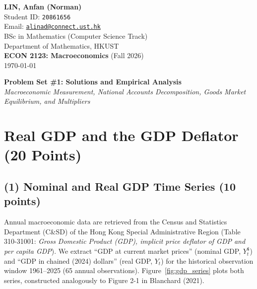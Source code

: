 \documentclass[11pt,a4paper]{article}
\begin{document}
\thispagestyle{plain}

\begin{flushright}
    \textbf{\large LIN, Anfan (Norman)} \\
    Student ID: \texttt{20861656} \\
    Email: \href{mailto:alinad@connect.ust.hk}{\texttt{alinad@connect.ust.hk}} \\
    BSc in Mathematics (Computer Science Track) \\
    Department of Mathematics, HKUST \\
    \textbf{ECON 2123: Macroeconomics} (Fall 2026) \\
    \today
\end{flushright}

\vspace{-0.6em}
\begin{center}
    {\Large \textbf{\color{hkustnavy}Problem Set \#1: Solutions and Empirical Analysis}} \\
    \vspace{0.25em}
    {\footnotesize \textit{Macroeconomic Measurement, National Accounts Decomposition, Goods Market Equilibrium, and Multipliers}}
\end{center}
\vspace{0.3em}

\section{Real GDP and the GDP Deflator (20 Points)}

\subsection*{(1) Nominal and Real GDP Time Series (10 points)}
Annual macroeconomic data are retrieved from the Census and Statistics Department (C\&SD) of the Hong Kong Special Administrative Region (Table 310-31001: \textit{Gross Domestic Product (GDP), implicit price deflator of GDP and per capita GDP}). We extract ``GDP at current market prices'' (nominal GDP, $Y_t^{\$}$) and ``GDP in chained (2024) dollars'' (real GDP, $Y_t$) for the historical observation window 1961--2025 (65 annual observations). Figure~\ref{fig:gdp_series} plots both series, constructed analogously to Figure 2-1 in Blanchard (2021).
\end{document}
